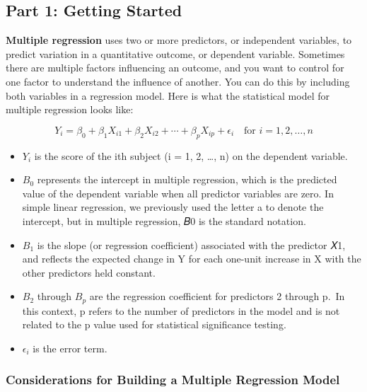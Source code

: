\documentclass[
  letterpaper,
  DIV=11,
  numbers=noendperiod]{scrreprt}
\begin{document}
\subsection{Part 1: Getting Started\,}\label{part-1-getting-started}

\textbf{Multiple regression} uses two or more predictors, or independent
variables, to predict variation in a quantitative outcome, or dependent
variable. Sometimes there are multiple factors influencing an outcome,
and you want to control for one factor to understand the influence of
another. You can do this by including both variables in a regression
model. Here is what the statistical model for multiple regression looks
like:\,\,

\[
Y_i = \beta_0 + \beta_1 X_{i1} + \beta_2 X_{i2} + \cdots + \beta_p X_{ip} + \epsilon_i
\quad \text{for } i = 1, 2, \ldots, n
\]

\begin{itemize}
\item
  \(Y_i\) is the score of the ith subject (i = 1, 2, \ldots, n) on the
  dependent variable.
\item
  \(B_0\) represents the intercept in multiple regression, which is the
  predicted value of the dependent variable when all predictor variables
  are zero. In simple linear regression, we previously used the letter a
  to denote the intercept, but in multiple regression, 𝐵0 is the
  standard notation.
\item
  \(B_1\) is the slope (or regression coefficient) associated with the
  predictor 𝑋1, and reflects the expected change in Y for each one-unit
  increase in X with the other predictors held constant.
\item
  \(B_2\) through \(B_p\) are the regression coefficient for predictors
  2 through p.~In this context, p refers to the number of predictors in
  the model and is not related to the p value used for statistical
  significance testing.
\item
  \(\epsilon_i\) is the error term.
\end{itemize}

\subsubsection*{Considerations for Building a Multiple Regression
Model}\label{considerations-for-building-a-multiple-regression-model}
\end{document}
